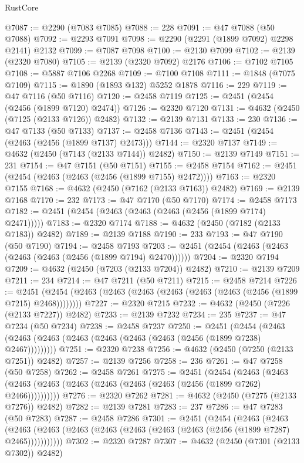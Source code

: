 \begin{lexlean}{RustCore}
\begin{coremodule}
@7087 := @2290 (@7083 @7085)
@7088 := 228
@7091 := @47 @7088 (@50 @7088)
@7092 := @2293 @7091
@7098 := @2290 (@2291 (@1899 @7092) @2298 @2141) @2132
@7099 := @7087 @7098
@7100 := @2130 @7099
@7102 := @2139 (@2320 @7080)
@7105 := @2139 (@2320 @7092) @2176
@7106 := @7102 @7105
@7108 := @5887 @7106 @2268
@7109 := @7100 @7108
@7111 := @1848 (@7075 @7109)
@7115 := @1890 (@1893 @132) @5252 @1878
@7116 := 229
@7119 := @47 @7116 (@50 @7116)
@7120 := @2458 @7119
@7125 := @2451 (@2454 (@2456 (@1899 @7120) @2474))
@7126 := @2320 @7120
@7131 := @4632 (@2450 (@7125 (@2133 @7126)) @2482)
@7132 := @2139 @7131
@7133 := 230
@7136 := @47 @7133 (@50 @7133)
@7137 := @2458 @7136
@7143 := @2451 (@2454 (@2463 (@2456 (@1899 @7137) @2473)))
@7144 := @2320 @7137
@7149 := @4632 (@2450 (@7143 (@2133 @7144)) @2482)
@7150 := @2139 @7149
@7151 := 231
@7154 := @47 @7151 (@50 @7151)
@7155 := @2458 @7154
@7162 := @2451 (@2454 (@2463 (@2463 (@2456 (@1899 @7155) @2472))))
@7163 := @2320 @7155
@7168 := @4632 (@2450 (@7162 (@2133 @7163)) @2482)
@7169 := @2139 @7168
@7170 := 232
@7173 := @47 @7170 (@50 @7170)
@7174 := @2458 @7173
@7182 := @2451 (@2454 (@2463 (@2463 (@2463 (@2456 (@1899 @7174) @2471)))))
@7183 := @2320 @7174
@7188 := @4632 (@2450 (@7182 (@2133 @7183)) @2482)
@7189 := @2139 @7188
@7190 := 233
@7193 := @47 @7190 (@50 @7190)
@7194 := @2458 @7193
@7203 := @2451 (@2454 (@2463 (@2463 (@2463 (@2463 (@2456 (@1899 @7194) @2470))))))
@7204 := @2320 @7194
@7209 := @4632 (@2450 (@7203 (@2133 @7204)) @2482)
@7210 := @2139 @7209
@7211 := 234
@7214 := @47 @7211 (@50 @7211)
@7215 := @2458 @7214
@7226 := @2451 (@2454 (@2463 (@2463 (@2463 (@2463 (@2463 (@2463 (@2456 (@1899 @7215) @2468))))))))
@7227 := @2320 @7215
@7232 := @4632 (@2450 (@7226 (@2133 @7227)) @2482)
@7233 := @2139 @7232
@7234 := 235
@7237 := @47 @7234 (@50 @7234)
@7238 := @2458 @7237
@7250 := @2451
    (@2454 (@2463 (@2463 (@2463 (@2463 (@2463 (@2463 (@2463 (@2456 (@1899 @7238) @2467)))))))))
@7251 := @2320 @7238
@7256 := @4632 (@2450 (@7250 (@2133 @7251)) @2482)
@7257 := @2139 @7256
@7258 := 236
@7261 := @47 @7258 (@50 @7258)
@7262 := @2458 @7261
@7275 := @2451
    (@2454
      (@2463 (@2463 (@2463 (@2463 (@2463 (@2463 (@2463 (@2463 (@2456 (@1899 @7262) @2466))))))))))
@7276 := @2320 @7262
@7281 := @4632 (@2450 (@7275 (@2133 @7276)) @2482)
@7282 := @2139 @7281
@7283 := 237
@7286 := @47 @7283 (@50 @7283)
@7287 := @2458 @7286
@7301 := @2451
    (@2454
      (@2463
        (@2463
          (@2463 (@2463 (@2463 (@2463 (@2463 (@2463 (@2463 (@2456 (@1899 @7287) @2465)))))))))))
@7302 := @2320 @7287
@7307 := @4632 (@2450 (@7301 (@2133 @7302)) @2482)

\end{coremodule}
\end{lexlean}
